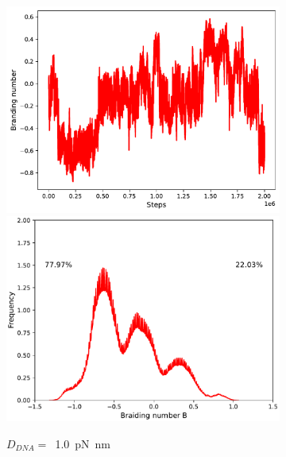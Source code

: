 \documentclass[a4paper,10pt]{article}
\begin{document}
\begin{figure}[tb]
\begin{subfigure}{.3\textwidth}
\includegraphics[width=\textwidth]{brD_100_brand.pdf}
\includegraphics[width=\textwidth]{brD_100_br_pr.pdf}
\caption{$D_{DNA}=$~\SI{1.0}{\pico\newton\nano\meter}}
\label{fig:braD_b}
\end{subfigure}
\begin{subfigure}{.3\textwidth}

\end{subfigure}
\end{figure}
\end{document}

